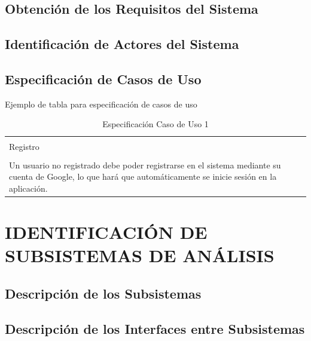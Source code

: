 \documentclass[11pt]{report}
\begin{document}
\subsection{Obtención de los Requisitos del Sistema} 

\subsection{Identificación de Actores del Sistema} 

\subsection{Especificación de Casos de Uso}

\textcolor[rgb]{0.65,0.16,0}{Ejemplo de tabla para especificación de casos de uso}

\begin{table}[htbp]
  \centering
  \caption{Especificación Caso de Uso 1}
    \begin{tabular}{p{20.855em}r}
\cmidrule{1-1}    \rowcolor[rgb]{ .949,  .949,  .949} \multicolumn{1}{p{20.855em}}{\textbf{Nombre del caso de uso}} & \multicolumn{1}{r}{\cellcolor[rgb]{ 1,  1,  1}} \\
\cmidrule{1-1}    \multicolumn{1}{p{20.855em}}{Registro} & \multicolumn{1}{r}{} \\
    \midrule
    \rowcolor[rgb]{ .949,  .949,  .949} \multicolumn{2}{p{31.64em}}{\textbf{Descripción}} \\
    \midrule
    \multicolumn{2}{p{31.64em}}{Un usuario no registrado debe poder registrarse en el sistema mediante su cuenta de Google, lo que hará que automáticamente se inicie sesión en la aplicación.} \\
    \bottomrule
    \end{tabular}%
  \label{espec_caso_uso_1}%
  \vspace{-4mm}
\end{table}%

\newpage
\section{IDENTIFICACIÓN DE SUBSISTEMAS DE ANÁLISIS}

\subsection{Descripción de los Subsistemas} 

\subsection{Descripción de los Interfaces entre Subsistemas}
\end{document}
